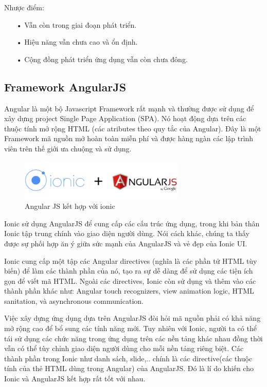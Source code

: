 Nhược điểm:


\begin{itemize}
\item[•] Vẫn còn trong giai đoạn phát triển.
\item[•] Hiệu năng vẫn chưa cao và ổn định.
\item[•] Cộng đồng phát triển ứng dụng vẫn còn chưa đông.
\end{itemize}

\subsection{Framework AngularJS}



Angular là một bộ Javascript Framework rất mạnh và thường được sử dụng để xây dựng project Single Page Application (SPA). Nó hoạt động dựa trên các thuộc tính mở rộng HTML (các atributes theo quy tắc của Angular). Đây là một Framework mã nguồn mở hoàn toàn miễn phí và được hàng ngàn các lập trình viên trên thế giới ưa chuộng và sử dụng.

\begin{figure}[H]
\centering    
\includegraphics[width=0.7\textwidth]{angularjs}
\caption[Angular JS kết hợp với ionic ]{Angular JS kết hợp với ionic}
\label{fig:angularjs}
\end{figure}

Ionic sử dụng AngularJS để cung cấp các cấu trúc ứng dụng, trong khi bản thân Ionic tập trung chính vào giao diện người dùng. Nói cách khác, chúng ta thấy được sự phối hợp ăn ý giữa sức mạnh của AngularJS và vẻ đẹp của Ionic UI.

Ionic cung cấp một tập các Angular directives (nghĩa là các phần tử HTML tùy biến) để làm các thành phần của nó, tạo ra sự dễ dàng để sử dụng các tiện ích gọn để viết mã HTML. Ngoài các directives, Ionic còn sử dụng và thêm vào các thành phần khác như: Angular touch recognizers, view animation logic, HTML sanitation, và asynchronous communication.

Việc xây dựng ứng dụng dựa trên AngularJS đòi hỏi mã nguồn phải có khả năng mở rộng cao để bổ sung các tính năng mới. Tuy nhiên với Ionic, người ta có thể tái sử dụng các chức năng trong ứng dụng trên các nền tảng khác nhau đồng thời vẫn có thể tùy chỉnh giao diện người dùng cho mỗi nền tảng riêng biệt. Các thành phần trong Ionic như danh sách, slide,.. chính là các directive(các thuộc tính của thẻ HTML dùng trong Angular) của AngularJS. Đó là lí do khiến cho Ionic và AngularJS kết hợp rất tốt với nhau.

